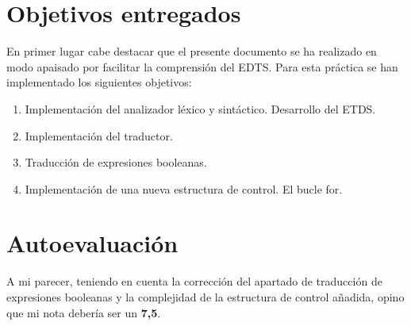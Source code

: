 \documentclass[12pt,a4paper, landscape]{article}
\theoremstyle{mytheor}
\begin{document}
\begin{titlepage}
  
  \vfill %
  
\end{titlepage}
\newpage
\tableofcontents
\newpage

\section{Objetivos entregados}
En primer lugar cabe destacar que el presente documento se ha realizado en modo apaisado por facilitar la comprensión del EDTS.
Para esta práctica se han implementado los siguientes objetivos:
\begin{enumerate}
\item Implementación del analizador léxico y sintáctico. Desarrollo del ETDS.
\item Implementación del traductor.
\item Traducción de expresiones booleanas.
\item Implementación de una nueva estructura de control. El bucle for.
\end{enumerate}


\section{Autoevaluación}
A mi parecer, teniendo en cuenta la corrección del apartado de traducción de expresiones booleanas y la complejidad de la estructura de control añadida, opino que mi nota debería ser un \textbf{7,5}.

\newpage
\end{document}

